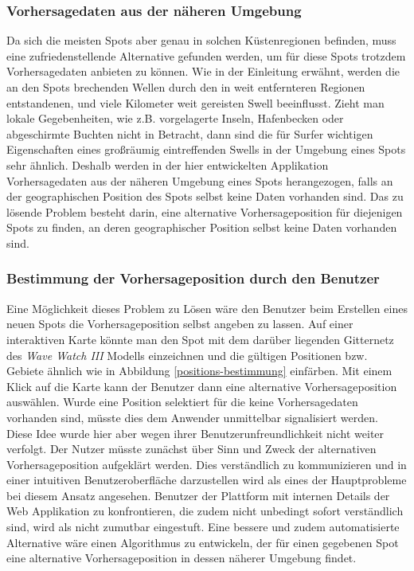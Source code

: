 \subsubsection{Vorhersagedaten aus der näheren Umgebung}
Da sich die meisten Spots aber genau in solchen Küstenregionen
befinden, muss eine zufriedenstellende Alternative gefunden werden, um
für diese Spots trotzdem Vorhersagedaten anbieten zu können. Wie in
der Einleitung erwähnt, werden die an den Spots brechenden Wellen
durch den in weit entfernteren Regionen entstandenen, und viele
Kilometer weit gereisten Swell beeinflusst. Zieht man lokale
Gegebenheiten, wie z.B. vorgelagerte Inseln, Hafenbecken oder
abgeschirmte Buchten nicht in Betracht, dann sind die für Surfer
wichtigen Eigenschaften eines großräumig eintreffenden Swells in der
Umgebung eines Spots sehr ähnlich. Deshalb werden in der hier
entwickelten Applikation Vorhersagedaten aus der näheren Umgebung
eines Spots herangezogen, falls an der geographischen Position des
Spots selbst keine Daten vorhanden sind. Das zu lösende Problem
besteht darin, eine alternative Vorhersageposition für diejenigen
Spots zu finden, an deren geographischer Position selbst keine Daten
vorhanden sind.

\subsubsection{Bestimmung der Vorhersageposition durch den Benutzer}
Eine Möglichkeit dieses Problem zu Lösen wäre den Benutzer beim
Erstellen eines neuen Spots die Vorhersageposition selbst angeben zu
lassen. Auf einer interaktiven Karte könnte man den Spot mit dem
darüber liegenden Gitternetz des \textit{Wave Watch III} Modells
einzeichnen und die gültigen Positionen bzw. Gebiete ähnlich wie in
Abbildung \ref{positions-bestimmung} einfärben. Mit einem Klick auf
die Karte kann der Benutzer dann eine alternative Vorhersageposition
auswählen. Wurde eine Position selektiert für die keine
Vorhersagedaten vorhanden sind, müsste dies dem Anwender unmittelbar
signalisiert werden. Diese Idee wurde hier aber wegen ihrer
Benutzerunfreundlichkeit nicht weiter verfolgt. Der Nutzer müsste
zunächst über Sinn und Zweck der alternativen Vorhersageposition
aufgeklärt werden. Dies verständlich zu kommunizieren und in einer
intuitiven Benutzeroberfläche darzustellen wird als eines der
Hauptprobleme bei diesem Ansatz angesehen.  Benutzer der Plattform mit
internen Details der Web Applikation zu konfrontieren, die zudem nicht
unbedingt sofort verständlich sind, wird als nicht zumutbar
eingestuft. Eine bessere und zudem automatisierte Alternative wäre
einen Algorithmus zu entwickeln, der für einen gegebenen Spot eine
alternative Vorhersageposition in dessen näherer Umgebung findet.

